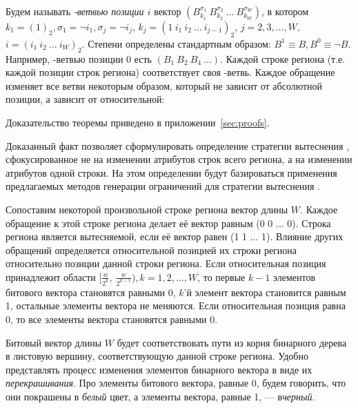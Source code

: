 Будем называть \emph{\PseudoLRU-ветвью позиции $i$} вектор
$(B_{k_1}^{\sigma_1}~B_{k_2}^{\sigma_2}~\dots~B_{k_W}^{\sigma_W})$,
в котором $k_1 = (1)_2, \sigma_1 = \neg i_1, \sigma_j = \neg i_j$, $k_j = (1~i_1~i_2~\dots~i_{j-1})_2$, $j = 2, 3, \dots, W$, $i = (i_1~i_2~\dots~i_W)_2$. Степени определены стандартным образом: $B^1 \equiv B, B^0 \equiv \neg B$. Например, \PseudoLRU-ветвью позиции 0 есть $(B_1~B_2~B_4~...)$. Каждой строке региона (т.е. каждой позиции строк региона) соответствует своя \PseudoLRU-ветвь. Каждое обращение изменяет все ветви некоторым образом, который не зависит от абсолютной позиции, а зависит от относительной:

\begin{theorem}\label{thm_pseudoLRU_invariant} \PseudoLRUInvariant
\end{theorem}
Доказательство теоремы приведено в приложении~\ref{sec:proofs}.

Доказанный факт позволяет сформулировать определение стратегии
вытеснения \PseudoLRU, сфокусированное не на изменении атрибутов строк всего
региона,
а на изменении атрибутов одной строки. На этом определении
будут базироваться применения предлагаемых методов генерации
ограничений для стратегии вытеснения \PseudoLRU.

\begin{utv}
Сопоставим некоторой произвольной строке региона вектор длины $W$. Каждое обращение к этой строке региона делает её вектор равным (0 0 ... 0). Строка региона является вытесняемой, если её вектор равен (1 1 ... 1).
Влияние других обращений определяется относительной позицией их
строки региона относительно позиции данной строки региона. Если относительная позиция
принадлежит области $[\frac{w}{2^k},~\frac{w}{2^{k-1}}), k =
1,2,...,W$, то первые $k{-}1$ элементов битового вектора становятся равными
0, $k$'й элемент вектора становится равным 1, остальные элементы
вектора не меняются. Если относительная позиция равна 0, то все элементы вектора становятся равными 0.
\end{utv}

Битовый вектор длины $W$ будет соответствовать пути из корня бинарного
дерева в листовую вершину, соответствующую данной строке региона.
Удобно представлять процесс изменения элементов бинарного вектора  в виде их
\emph{перекрашивания}. Про элементы битового вектора, равные 0,
будем говорить, что они покрашены в \emph{белый} цвет, а элементы вектора, равные 1, --- в\emph{черный}.

